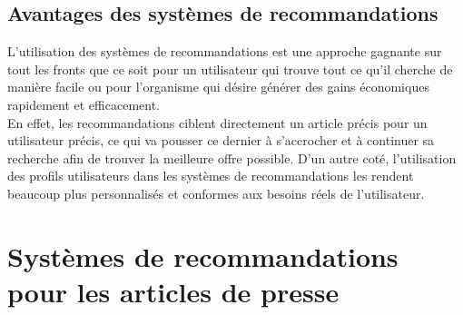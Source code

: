     \subsection*{Avantages des systèmes de recommandations}
    L'utilisation des systèmes de recommandations est une approche gagnante sur tout les fronts que ce soit pour un utilisateur qui trouve tout ce qu'il cherche de manière facile ou pour l'organisme qui désire générer des gains économiques rapidement et efficacement.\\
    En effet, les recommandations ciblent directement un article précis pour un utilisateur précis, ce qui va pousser ce dernier à s'accrocher et à continuer sa recherche afin de trouver la meilleure offre possible. D'un autre coté, l'utilisation des profils utilisateurs dans les systèmes de recommandations les rendent beaucoup plus personnalisés et conformes aux besoins réels de l'utilisateur.\cite{figfiltering}

\section{Systèmes de recommandations pour les articles de presse}
